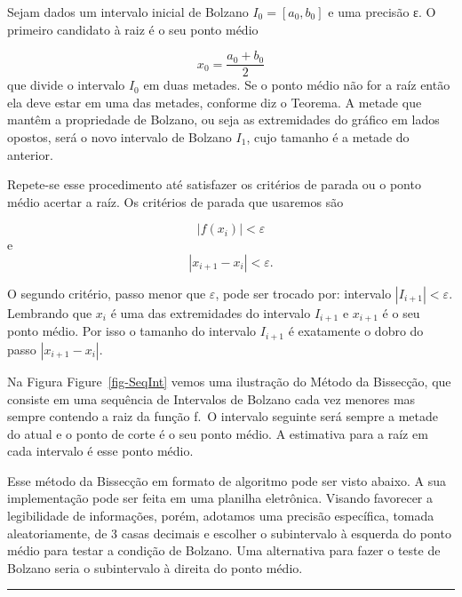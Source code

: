 \documentclass[
  letterpaper,
  DIV=11,
  numbers=noendperiod]{scrreprt}
\begin{document}
Sejam dados um intervalo inicial de Bolzano \(I_{0}=[a_{0},b_{0}]\) e
uma precisão ɛ. O primeiro candidato à raiz é o seu ponto médio

\[x_{0}=\frac{a_{0}+b_{0}}{2}\] que divide o intervalo \(I_{0}\) em duas
metades. Se o ponto médio não for a raíz então ela deve estar em uma das
metades, conforme diz o Teorema. A metade que mantêm a propriedade de
Bolzano, ou seja as extremidades do gráfico em lados opostos, será o
novo intervalo de Bolzano \(I_{1}\), cujo tamanho é a metade do
anterior.

Repete-se esse procedimento até satisfazer os critérios de parada ou o
ponto médio acertar a raíz. Os critérios de parada que usaremos são

\[|f(x_{i})|<\varepsilon\] e \[|x_{i+1}-x_{i}|<\varepsilon.\]

O segundo critério, passo menor que \(\varepsilon\), pode ser trocado
por: intervalo \(\left|I_{i+1}\right|<\varepsilon\). Lembrando que
\(x_{i}\) é uma das extremidades do intervalo \(I_{i+1}\) e \(x_{i+1}\)
é o seu ponto médio. Por isso o tamanho do intervalo \(I_{i+1}\) é
exatamente o dobro do passo \(|x_{i+1}-x_{i}|\).

Na Figura Figure~\ref{fig-SeqInt} vemos uma ilustração do Método da
Bissecção, que consiste em uma sequência de Intervalos de Bolzano cada
vez menores mas sempre contendo a raiz da função f.~O intervalo seguinte
será sempre a metade do atual e o ponto de corte é o seu ponto médio. A
estimativa para a raíz em cada intervalo é esse ponto médio.

Esse método da Bissecção em formato de algoritmo pode ser visto abaixo.
A sua implementação pode ser feita em uma planilha eletrônica. Visando
favorecer a legibilidade de informações, porém, adotamos uma precisão
específica, tomada aleatoriamente, de 3 casas decimais e escolher o
subintervalo à esquerda do ponto médio para testar a condição de
Bolzano. Uma alternativa para fazer o teste de Bolzano seria o
subintervalo à direita do ponto médio.

\begin{center}\rule{0.5\linewidth}{0.5pt}\end{center}
\end{document}
